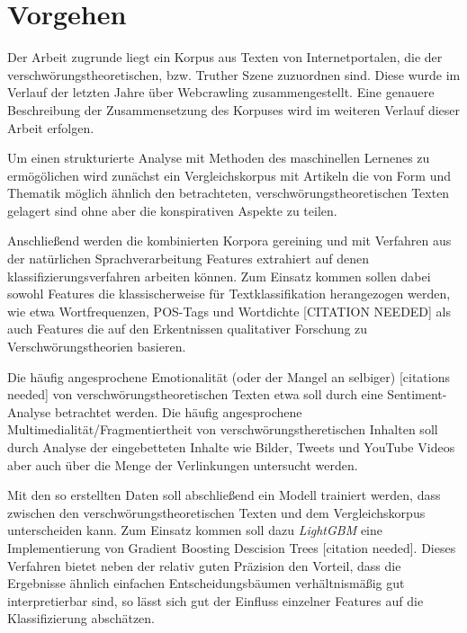 \section{Vorgehen}

Der Arbeit zugrunde liegt ein Korpus aus Texten von Internetportalen, die der verschwörungstheoretischen, bzw. Truther Szene zuzuordnen sind.
Diese wurde im Verlauf der letzten Jahre über Webcrawling zusammengestellt.
Eine genauere Beschreibung der Zusammensetzung des Korpuses wird im weiteren Verlauf dieser Arbeit erfolgen.

Um einen strukturierte Analyse mit Methoden des maschinellen Lernenes zu ermögölichen wird zunächst ein Vergleichskorpus mit Artikeln die von Form und Thematik möglich ähnlich den betrachteten, verschwörungstheoretischen Texten gelagert sind ohne aber die konspirativen Aspekte zu teilen.

Anschließend werden die kombinierten Korpora gereining und mit Verfahren aus der natürlichen Sprachverarbeitung Features extrahiert auf denen klassifizierungsverfahren arbeiten können.
Zum Einsatz kommen sollen dabei sowohl Features die klassischerweise für Textklassifikation herangezogen werden, wie etwa Wortfrequenzen, POS-Tags und Wortdichte [CITATION NEEDED] als auch Features die auf den Erkentnissen qualitativer Forschung zu Verschwörungstheorien basieren.

Die häufig angesprochene Emotionalität (oder der Mangel an selbiger) [citations needed] von verschwörungstheoretischen Texten etwa soll durch eine Sentiment-Analyse betrachtet werden.
Die häufig angesprochene Multimedialität/Fragmentiertheit von verschwörungstheretischen Inhalten soll durch Analyse der eingebetteten Inhalte wie Bilder, Tweets und YouTube Videos aber auch über die Menge der Verlinkungen untersucht werden.

Mit den so erstellten Daten soll abschließend ein Modell trainiert werden, dass zwischen den verschwörungstheoretischen Texten und dem Vergleichskorpus unterscheiden kann.
Zum Einsatz kommen soll dazu \textit{LightGBM} \parencite[][]{lightgbm} eine Implementierung von Gradient Boosting Descision Trees [citation needed].
Dieses Verfahren bietet neben der relativ guten Präzision den Vorteil, dass die Ergebnisse ähnlich einfachen Entscheidungsbäumen verhältnismäßig gut interpretierbar sind, so lässt sich gut der Einfluss einzelner Features auf die Klassifizierung abschätzen.